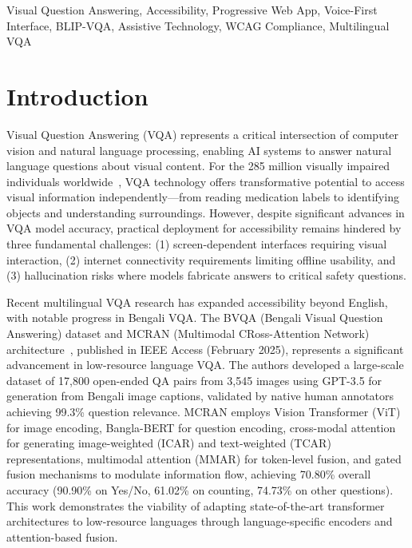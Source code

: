 \documentclass[conference]{IEEEtran}
\begin{document}
\begin{IEEEkeywords}
Visual Question Answering, Accessibility, Progressive Web App, Voice-First Interface, BLIP-VQA, Assistive Technology, WCAG Compliance, Multilingual VQA
\end{IEEEkeywords}

\section{Introduction}

Visual Question Answering (VQA) represents a critical intersection of computer vision and natural language processing, enabling AI systems to answer natural language questions about visual content. For the 285 million visually impaired individuals worldwide~\cite{who_2023}, VQA technology offers transformative potential to access visual information independently—from reading medication labels to identifying objects and understanding surroundings. However, despite significant advances in VQA model accuracy, practical deployment for accessibility remains hindered by three fundamental challenges: (1) screen-dependent interfaces requiring visual interaction, (2) internet connectivity requirements limiting offline usability, and (3) hallucination risks where models fabricate answers to critical safety questions.

Recent multilingual VQA research has expanded accessibility beyond English, with notable progress in Bengali VQA. The BVQA (Bengali Visual Question Answering) dataset and MCRAN (Multimodal CRoss-Attention Network) architecture~\cite{bvqa_2025}, published in IEEE Access (February 2025), represents a significant advancement in low-resource language VQA. The authors developed a large-scale dataset of 17,800 open-ended QA pairs from 3,545 images using GPT-3.5 for generation from Bengali image captions, validated by native human annotators achieving 99.3\% question relevance. MCRAN employs Vision Transformer (ViT) for image encoding, Bangla-BERT for question encoding, cross-modal attention for generating image-weighted (ICAR) and text-weighted (TCAR) representations, multimodal attention (MMAR) for token-level fusion, and gated fusion mechanisms to modulate information flow, achieving 70.80\% overall accuracy (90.90\% on Yes/No, 61.02\% on counting, 74.73\% on other questions). This work demonstrates the viability of adapting state-of-the-art transformer architectures to low-resource languages through language-specific encoders and attention-based fusion.
\end{document}
